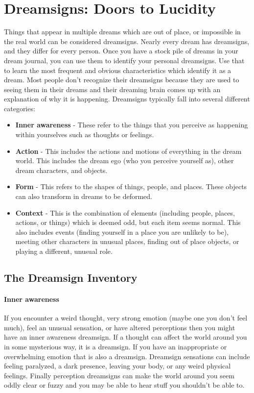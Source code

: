 \documentclass{book}
\begin{document}
\section{Dreamsigns: Doors to Lucidity}
Things that appear in multiple dreams which are out of place, or impossible in the real world can be considered dreamsigns. Nearly every dream has dreamsigns, and they differ for every person. Once you have a stock pile of dreams in your dream journal, you can use them to identify your personal dreamsigns. Use that to learn the most frequent and obvious characteristics which identify it as a dream. Most people don't recognize their dreamsigns because they are used to seeing them in their dreams and their dreaming brain comes up with an explanation of why it is happening. Dreamsigns typically fall into several different categories:
\begin{itemize}
  \item \textbf{Inner awareness} - These refer to the things that you perceive as happening within yourselves such as thoughts or feelings.
  \item \textbf{Action} - This includes the actions and motions of everything in the dream world. This includes the dream ego (who you perceive yourself as), other dream characters, and objects.
  \item \textbf{Form} - This refers to the shapes of things, people, and places. These objects can also transform in dreams to be deformed.
  \item \textbf{Context} - This is the combination of elements (including people, places, actions, or things) which is deemed odd, but each item seems normal. This also includes events (finding yourself in a place you are unlikely to be), meeting other characters in unusual places, finding out of place objects, or playing a different, unusual role.
\end{itemize}

\subsection{The Dreamsign Inventory \cite{leberge}}
\paragraph{Inner awareness} If you encounter a weird thought, very strong emotion (maybe one you don't feel much), feel an unusual sensation, or have altered perceptions then you might have an inner awareness dreamsign. If a thought can affect the world around you in some mysterious way, it is a dreamsign. If you have an inappropriate or overwhelming emotion that is also a dreamsign. Dreamsign sensations can include feeling paralyzed, a dark presence, leaving your body, or any weird physical feelings. Finally perception dreamsigns can make the world around you seem oddly clear or fuzzy and you may be able to hear stuff you shouldn't be able to.
\end{document}

